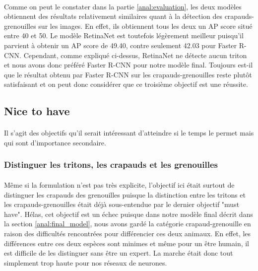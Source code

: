 \paragraph{} Comme on peut le constater dans la partie \ref{anal:evaluation}, les deux modèles obtiennent des résultats relativement similaires quant à la détection des crapauds-grenouilles sur les images. En effet, ils obtiennent tous les deux un AP score situé entre 40 et 50. Le modèle RetinaNet est toutefois légèrement meilleur puisqu'il parvient à obtenir un AP score de 49.40, contre seulement 42.03 pour Faster R-CNN. Cependant, comme expliqué ci-dessus, RetinaNet ne détecte aucun triton et nous avons donc préféré Faster R-CNN pour notre modèle final. Toujours est-il que le résultat obtenu par Faster R-CNN sur les crapauds-grenouilles reste plutôt satisfaisant et on peut donc considérer que ce troisième objectif est une réussite.

\subsection{Nice to have}
\paragraph{} Il s'agit des objectifs qu'il serait intéressant d'atteindre si le temps le permet mais qui sont d'importance secondaire.

\subsubsection{Distinguer les tritons, les crapauds et les grenouilles}
\paragraph{} Même si la formulation n'est pas très explicite, l'objectif ici était surtout de distinguer les crapauds des grenouilles puisque la distinction entre les tritons et les crapauds-grenouilles était déjà sous-entendue par le dernier objectif "must have". Hélas, cet objectif est un échec puisque dans notre modèle final décrit dans la section \ref{anal:final_model}, nous avons gardé la catégorie crapaud-grenouille en raison des difficultés rencontrées pour différencier ces deux animaux. En effet, les différences entre ces deux espèces sont minimes et même pour un être humain, il est difficile de les distinguer sans être un expert. La marche était donc tout simplement trop haute pour nos réseaux de neurones.

